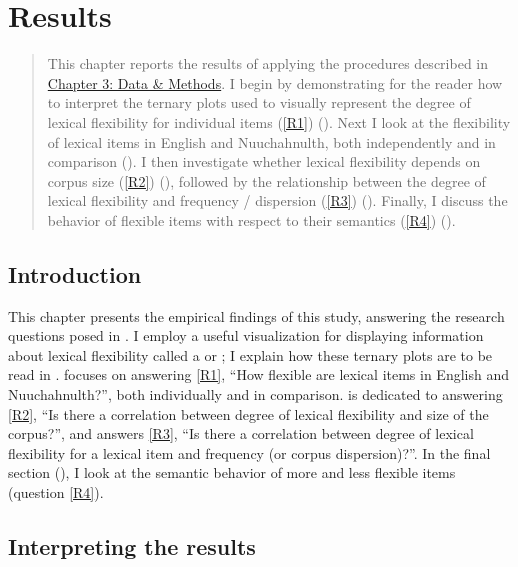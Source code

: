 \chapter{Results}
\label{ch:results}

\blockquote{This chapter reports the results of applying the procedures described in \hyperref[ch:methods]{Chapter 3: Data \& Methods}. I begin by demonstrating for the reader how to interpret the ternary plots used to visually represent the degree of lexical flexibility for individual items (\ref{R1}) (). Next I look at the flexibility of lexical items in English and Nuuchahnulth, both independently and in comparison (). I then investigate whether lexical flexibility depends on corpus size (\ref{R2}) (), followed by the relationship between the degree of lexical flexibility and frequency / dispersion (\ref{R3}) (). Finally, I discuss the behavior of flexible items with respect to their semantics (\ref{R4}) ().}

\section{Introduction}
\label{sec:4.1}

This chapter presents the empirical findings of this study, answering the research questions posed in . I employ a useful visualization for displaying information about lexical flexibility called a  or ; I explain how these ternary plots are to be read in .  focuses on answering \ref{R1}, \enquote{How flexible are lexical items in English and Nuuchahnulth?}, both individually and in comparison.  is dedicated to answering \ref{R2}, \enquote{Is there a correlation between degree of lexical flexibility and size of the corpus?}, and  answers \ref{R3}, \enquote{Is there a correlation between degree of lexical flexibility for a lexical item and frequency (or corpus dispersion)?}. In the final section (), I look at the semantic behavior of more and less flexible items (question \ref{R4}).

\section{Interpreting the results}
\label{sec:4.2}


